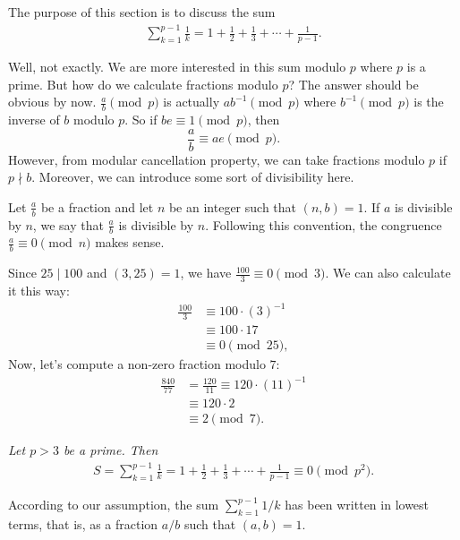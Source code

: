 \documentclass[12pt]{subfile}
\begin{document}
	The purpose of this section is to discuss the sum
		\begin{align*}
			\sum_{k=1}^{p-1} \frac{1}{k} = 1+\frac{1}{2}+ \frac{1}{3}+\cdots+ \frac{1}{p-1}.
		\end{align*}

	Well, not exactly. We are more interested in this sum modulo $p$ where $p$ is a prime. But how do we calculate fractions modulo $p$? The answer should be obvious by now. $\frac{a}{b}\pmod p$ is actually $ab^{-1}\pmod p$ where $b^{-1}\pmod p$ is the inverse of $b$ modulo $p$. So if $be\equiv1\pmod p$, then $$\frac{a}{b}\equiv ae\pmod p.$$ However, from modular cancellation property, we can take fractions modulo $p$ if $p\nmid b$. Moreover, we can introduce some sort of divisibility here.

	Let $ \frac{a}{b}$ be a fraction and let $n$ be an integer such that $(n,b)=1$. If $a$ is divisible by $n$, we say that $ \frac{a}{b}$ is divisible by $n$. Following this convention, the congruence $\frac{a}{b} \equiv 0 \pmod n$ makes sense.
		\begin{example}
			Since $25 \mid 100$ and $(3,25)=1$, we have $\frac{100}{3} \equiv 0 \pmod 3$. We can also calculate it this way:
				\begin{align*}
					\frac{100}{3}   &\equiv 100 \cdot (3)^{-1} \\
					&\equiv 100 \cdot 17\\
					&\equiv 0 \pmod{25},
				\end{align*}
			Now, let's compute a non-zero fraction modulo $7$:
				\begin{align*}
					\frac{840}{77} &= \frac{120}{11} \equiv 120 \cdot (11)^{-1}\\
					&\equiv 120 \cdot 2 \\
					& \equiv 2 \pmod{7}.
				\end{align*}
		\end{example}


		\begin{theorem}\slshape\label{thm:wolst}
			Let $p>3$ be a prime. Then
			\begin{align*}
				S = \sum_{k=1}^{p-1} \frac{1}{k} = 1+\frac{1}{2}+ \frac{1}{3}+\cdots+ \frac{1}{p-1} \equiv 0 \pmod{p^2}.
			\end{align*}
		\end{theorem}

		\begin{note}
			According to our assumption, the sum $ \sum_{k=1}^{p-1} 1/k$ has been written in lowest terms, that is, as a fraction $a/b$ such that $(a,b)=1$.
		\end{note}
\end{document}

